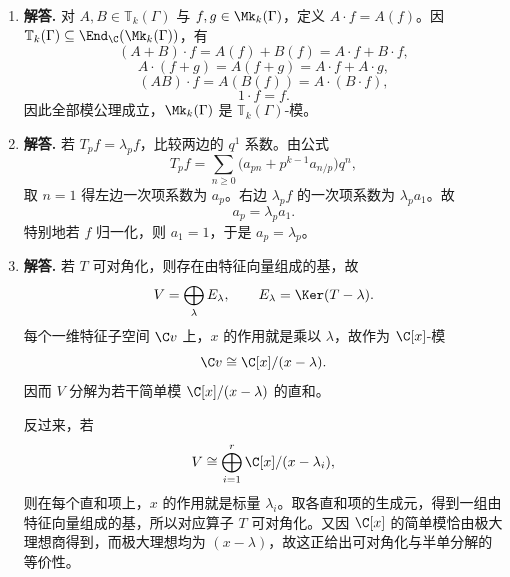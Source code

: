\begin{enumerate}[label=\textbf{\arabic*.}, leftmargin=*, itemsep=1em]
  \item \textbf{解答.} 对 $A,B\in\mathbb T_k(\Gamma)$ 与 $f,g\in\Mk_k(\Gamma)$，定义 $A\cdot f=A(f)$。因 $\mathbb T_k(\Gamma)\subseteq \End_\C(\Mk_k(\Gamma))$，有
  \[
  (A+B)\cdot f=A(f)+B(f)=A\cdot f+B\cdot f,
  \]
  \[
  A\cdot(f+g)=A(f+g)=A\cdot f+A\cdot g,
  \]
  \[
  (AB)\cdot f=A(B(f))=A\cdot(B\cdot f),
  \]
  \[
  1\cdot f=f.
  \]
  因此全部模公理成立，$\Mk_k(\Gamma)$ 是 $\mathbb T_k(\Gamma)$-模。

  \item \textbf{解答.} 若 $T_pf=\lambda_pf$，比较两边的 $q^1$ 系数。由公式
  \[
  T_pf=\sum_{n\ge 0}\bigl(a_{pn}+p^{k-1}a_{n/p}\bigr)q^n,
  \]
  取 $n=1$ 得左边一次项系数为 $a_p$。右边 $\lambda_pf$ 的一次项系数为 $\lambda_pa_1$。故
  \[
  a_p=\lambda_pa_1.
  \]
  特别地若 $f$ 归一化，则 $a_1=1$，于是 $a_p=\lambda_p$。

  \item \textbf{解答.} 若 $T$ 可对角化，则存在由特征向量组成的基，故
  \[
  V=\bigoplus_\lambda E_\lambda,
  \qquad E_\lambda=\Ker(T-\lambda).
  \]
  每个一维特征子空间 $\C v$ 上，$x$ 的作用就是乘以 $\lambda$，故作为 $\C[x]$-模
  \[
  \C v\cong \C[x]/(x-\lambda).
  \]
  因而 $V$ 分解为若干简单模 $\C[x]/(x-\lambda)$ 的直和。

  反过来，若
  \[
  V\cong \bigoplus_{i=1}^r \C[x]/(x-\lambda_i),
  \]
  则在每个直和项上，$x$ 的作用就是标量 $\lambda_i$。取各直和项的生成元，得到一组由特征向量组成的基，所以对应算子 $T$ 可对角化。又因 $\C[x]$ 的简单模恰由极大理想商得到，而极大理想均为 $(x-\lambda)$，故这正给出可对角化与半单分解的等价性。
\end{enumerate}
